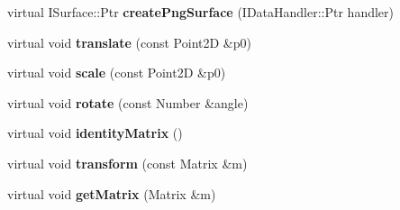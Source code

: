 \begin{DoxyCompactItemize}
\item 
\hypertarget{classsambag_1_1disco_1_1_cairo_draw_context_ab4ac9a61b1736eb1358c6db1101ad3a0}{
virtual ISurface::Ptr {\bfseries createPngSurface} (IDataHandler::Ptr handler)}
\label{classsambag_1_1disco_1_1_cairo_draw_context_ab4ac9a61b1736eb1358c6db1101ad3a0}

\item 
\hypertarget{classsambag_1_1disco_1_1_cairo_draw_context_a4fbc6fa2e607327a7a9c1e92ca44c6b3}{
virtual void {\bfseries translate} (const Point2D \&p0)}
\label{classsambag_1_1disco_1_1_cairo_draw_context_a4fbc6fa2e607327a7a9c1e92ca44c6b3}

\item 
\hypertarget{classsambag_1_1disco_1_1_cairo_draw_context_aed0f1ebf355748bbea0032ccef47ff07}{
virtual void {\bfseries scale} (const Point2D \&p0)}
\label{classsambag_1_1disco_1_1_cairo_draw_context_aed0f1ebf355748bbea0032ccef47ff07}

\item 
\hypertarget{classsambag_1_1disco_1_1_cairo_draw_context_a95ddc0c22231e42ce81faf7013c54005}{
virtual void {\bfseries rotate} (const Number \&angle)}
\label{classsambag_1_1disco_1_1_cairo_draw_context_a95ddc0c22231e42ce81faf7013c54005}

\item 
\hypertarget{classsambag_1_1disco_1_1_cairo_draw_context_a39fa2cb8c47ddfb8d2cef8380cea2b19}{
virtual void {\bfseries identityMatrix} ()}
\label{classsambag_1_1disco_1_1_cairo_draw_context_a39fa2cb8c47ddfb8d2cef8380cea2b19}

\item 
\hypertarget{classsambag_1_1disco_1_1_cairo_draw_context_a6ef22c9562eaf02bd04d27a6ec3346d9}{
virtual void {\bfseries transform} (const Matrix \&m)}
\label{classsambag_1_1disco_1_1_cairo_draw_context_a6ef22c9562eaf02bd04d27a6ec3346d9}

\item 
\hypertarget{classsambag_1_1disco_1_1_cairo_draw_context_a94c50c37f7462a21cf8ac4e0f39bc705}{
virtual void {\bfseries getMatrix} (Matrix \&m)}
\label{classsambag_1_1disco_1_1_cairo_draw_context_a94c50c37f7462a21cf8ac4e0f39bc705}

\end{DoxyCompactItemize}
